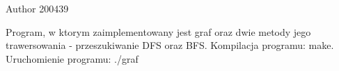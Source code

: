 \begin{DoxyAuthor}{\-Author}
200439
\end{DoxyAuthor}
\-Program, w ktorym zaimplementowany jest graf oraz dwie metody jego trawersowania -\/ przeszukiwanie \-D\-F\-S oraz \-B\-F\-S. \-Kompilacja programu\-: make. \-Uruchomienie programu\-: ./graf 